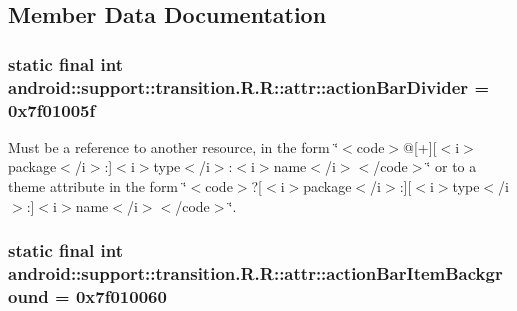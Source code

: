\subsection{Member Data Documentation}
\hypertarget{classandroid_1_1support_1_1transition_1_1_r_1_1attr_6b9539f9e7c90c73ecb1db49a2acb3ff}{
\subsubsection[{actionBarDivider}]{\setlength{\rightskip}{0pt plus 5cm}static final int android::support::transition.R.R::attr::actionBarDivider = 0x7f01005f}}
\label{classandroid_1_1support_1_1transition_1_1_r_1_1attr_6b9539f9e7c90c73ecb1db49a2acb3ff}


Must be a reference to another resource, in the form \char`\"{}$<$code$>$@\mbox{[}+\mbox{]}\mbox{[}$<$i$>$package$<$/i$>$:\mbox{]}$<$i$>$type$<$/i$>$:$<$i$>$name$<$/i$>$$<$/code$>$\char`\"{} or to a theme attribute in the form \char`\"{}$<$code$>$?\mbox{[}$<$i$>$package$<$/i$>$:\mbox{]}\mbox{[}$<$i$>$type$<$/i$>$:\mbox{]}$<$i$>$name$<$/i$>$$<$/code$>$\char`\"{}. \hypertarget{classandroid_1_1support_1_1transition_1_1_r_1_1attr_9a0ca250c5fb10d3381bf77a0011c5f4}{
\subsubsection[{actionBarItemBackground}]{\setlength{\rightskip}{0pt plus 5cm}static final int android::support::transition.R.R::attr::actionBarItemBackground = 0x7f010060}}
\label{classandroid_1_1support_1_1transition_1_1_r_1_1attr_9a0ca250c5fb10d3381bf77a0011c5f4}


